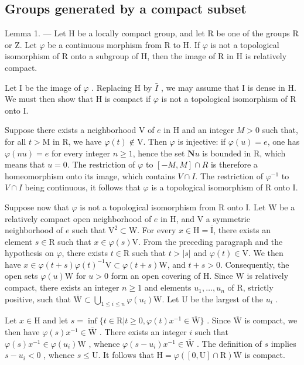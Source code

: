 \subsection{Groups generated by a compact subset}

Lemma 1. --- Let H be a locally compact group, and let R be one of the groups R or Z. Let \(\varphi\) be a continuous morphism from R to H. If \(\varphi\) is not a topological isomorphism of R onto a subgroup of H, then the image of R in H is relatively compact.

Let I be the image of \(\varphi\) . Replacing H by \(\bar{I}\) , we may assume that I is dense in H. We must then show that H is compact if \(\varphi\) is not a topological isomorphism of R onto I.

Suppose there exists a neighborhood V of \(e\) in H and an integer \(M > 0\) such that, for all \(t > \mathrm{M}\) in R, we have \(\varphi(t) \notin \mathrm{V}\). Then \(\varphi\) is injective: if \(\varphi(u) = e\), one has \(\varphi(nu) = e\) for every integer \(n \geqslant 1\), hence the set \(\mathbf{N}u\) is bounded in R, which means that \(u = 0\). The restriction of \(\varphi\) to \([-M, M] \cap R\) is therefore a homeomorphism onto its image, which contains \(V \cap I\). The restriction of \(\varphi^{-1}\) to \(V \cap I\) being continuous, it follows that \(\varphi\) is a topological isomorphism of R onto I.

Suppose now that \(\varphi\) is not a topological isomorphism from R onto I. Let W be a relatively compact open neighborhood of \(e\) in H, and V a symmetric neighborhood of \(e\) such that \(\mathrm{V}^2 \subset \mathrm{W}\). For every \(x \in \mathrm{H} = \overline{\mathrm{I}}\), there exists an element \(s \in \mathrm{R}\) such that \(x \in \varphi(s)\mathrm{V}\). From the preceding paragraph and the hypothesis on \(\varphi\), there exists \(t \in \mathrm{R}\) such that \(t > |s|\) and \(\varphi(t) \in \mathrm{V}\). We then have \(x \in \varphi(t + s)\varphi(t)^{-1}\mathrm{V} \subset \varphi(t + s)\mathrm{W}\), and \(t + s > 0\). Consequently, the open sets \(\varphi(u)\mathrm{W}\) for \(u > 0\) form an open covering of H. Since W is relatively compact, there exists an integer \(n \geqslant 1\) and elements \(u_1, \ldots, u_n\) of R, strictly positive, such that \(\overline{\mathrm{W}} \subset \bigcup_{1 \leqslant i \leqslant n} \varphi(u_i)\mathrm{W}\). Let U be the largest of the \(u_i\) .

Let \(x \in \mathrm{H}\) and let \(s = \inf \{t \in \mathrm{R} | t \geqslant 0, \varphi(t)x^{-1} \in \overline{\mathrm{W}}\}\) . Since \(\overline{\mathrm{W}}\) is compact, we then have \(\varphi(s)x^{-1} \in \overline{\mathrm{W}}\) . There exists an integer \(i\) such that \(\varphi(s)x^{-1} \in \varphi(u_i)\mathrm{W}\) , whence \(\varphi(s - u_i)x^{-1} \in \overline{\mathrm{W}}\) . The definition of \(s\) implies \(s - u_i < 0\) , whence \(s \leqslant \mathrm{U}\). It follows that \(\mathrm{H} = \varphi([0,\mathrm{U}] \cap \mathrm{R})\overline{\mathrm{W}}\) is compact.

